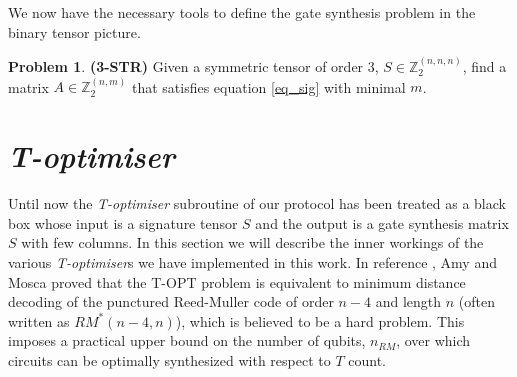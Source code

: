 \documentclass[notitlepage]{article}
\theoremstyle{definition}
\theoremstyle{problem}
\newtheorem{problem}{Problem}[section]
\theoremstyle{lemma}
\begin{document}
We now have the necessary tools to define the gate synthesis problem in the binary tensor picture.
\theoremstyle{problem}

\begin{problem}{\textbf{(3-STR)}}
	Given a symmetric tensor of order 3, $S\in \mathbb{Z}_2^{(n,n,n)}$, find a matrix $A \in \mathbb{Z}_2^{(n,m)}$ that satisfies equation \ref{eq_sig} with minimal $m$.
\end{problem}

\section{\emph{T-optimiser}}
\label{s_topt}
Until now the \emph{T-optimiser} subroutine of our protocol has been treated as a black box whose input is a signature tensor $S$ and the output is a gate synthesis matrix $S$ with few columns. In this section we will describe the inner workings of the various \emph{T-optimiser}s we have implemented in this work. In reference \cite{3_Amy_2016}, Amy and Mosca proved that the T-OPT problem is equivalent to minimum distance decoding of the punctured Reed-Muller code of order $n-4$ and length $n$ (often written as $RM^*(n-4, n)$), which is believed to be a hard problem. This imposes a practical upper bound on the number of qubits, $n_{RM}$, over which circuits can be optimally synthesized with respect to $T$ count.
\end{document}
